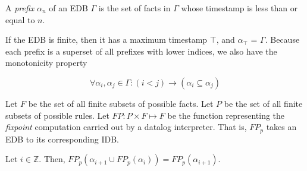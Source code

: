 \begin{definition}
A \emph{prefix} $\alpha_{n}$ of an EDB $\Gamma$ is the set of facts in $\Gamma$ whose timestamp is less than or equal to $n$.
\end{definition}

If the EDB is finite, then it has a maximum timestamp $\top$, and $\alpha_{\top}$ = $\Gamma$.  Because each prefix is a superset of all 
prefixes with lower indices, we also have the monotonicity property

\begin{equation}
\forall \alpha_{i}, \alpha_{j} \in \Gamma : (i < j) \to (\alpha_{i} \subseteq \alpha_{j})
\end{equation}



\begin{definition}
Let $F$ be the set of all finite subsets of possible facts.   
Let $P$ be the set of all finite subsets of possible rules.
Let $FP : P \times F \mapsto F$ be the function representing the
\emph{fixpoint} computation carried out by a datalog interpreter.  That is, $FP_p$ takes an EDB to its corresponding IDB.
\end{definition}


\begin{lemma}
\label{lem:costmodel}
%
Let $i \in \mathbb{Z}$.  Then, $FP_p(\alpha_{i+1} \cup FP_p(\alpha_i)) =
FP_p(\alpha_{i+1})$.
%
\end{lemma}


